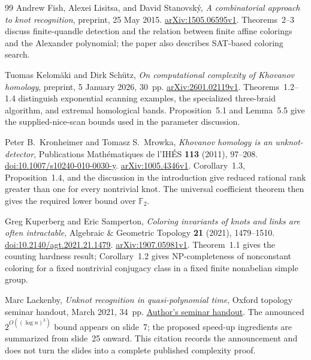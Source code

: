 \begin{thebibliography}{99}
Andrew Fish, Alexei Lisitsa, and David Stanovsk\'y,
\emph{A combinatorial approach to knot recognition},
preprint, 25 May 2015.
\href{https://arxiv.org/abs/1505.06595v1}{arXiv:1505.06595v1}.
Theorems~2--3 discuss finite-quandle detection and the relation between
finite affine colorings and the Alexander polynomial; the paper also
describes SAT-based coloring search.

Tuomas Kelom\"aki and Dirk Sch\"utz,
\emph{On computational complexity of Khovanov homology},
preprint, 5 January 2026, 30~pp.
\href{https://arxiv.org/abs/2601.02119v1}{arXiv:2601.02119v1}.
Theorems~1.2--1.4 distinguish exponential scanning examples, the specialized
three-braid algorithm, and extremal homological bands. Proposition~5.1 and
Lemma~5.5 give the supplied-nice-scan bounds used in the parameter discussion.

Peter B.~Kronheimer and Tomasz S.~Mrowka,
\emph{Khovanov homology is an unknot-detector},
Publications Math\'ematiques de l'IH\'ES
\textbf{113} (2011), 97--208.
\href{https://doi.org/10.1007/s10240-010-0030-y}{doi:10.1007/s10240-010-0030-y}.
\href{https://arxiv.org/abs/1005.4346v1}{arXiv:1005.4346v1}.
Corollary~1.3, Proposition~1.4, and the discussion in the introduction give
reduced rational rank greater than one for every nontrivial knot. The
universal coefficient theorem then gives the required lower bound over
$\mathbb F_2$.

Greg Kuperberg and Eric Samperton,
\emph{Coloring invariants of knots and links are often intractable},
Algebraic \& Geometric Topology
\textbf{21} (2021), 1479--1510.
\href{https://doi.org/10.2140/agt.2021.21.1479}{doi:10.2140/agt.2021.21.1479}.
\href{https://arxiv.org/abs/1907.05981v1}{arXiv:1907.05981v1}.
Theorem~1.1 gives the counting hardness result; Corollary~1.2 gives
NP-completeness of nonconstant coloring for a fixed nontrivial conjugacy
class in a fixed finite nonabelian simple group.

Marc Lackenby,
\emph{Unknot recognition in quasi-polynomial time},
Oxford topology seminar handout, March 2021, 34~pp.
\href{https://people.maths.ox.ac.uk/lackenby/quasipolynomial-talk-oxford-compressed.pdf}{Author's seminar handout}.
The announced $2^{O((\log n)^3)}$ bound appears on slide~7;
the proposed speed-up ingredients are summarized from slide~25 onward.
This citation records the announcement and does not turn the slides into
a complete published complexity proof.


\end{thebibliography}
